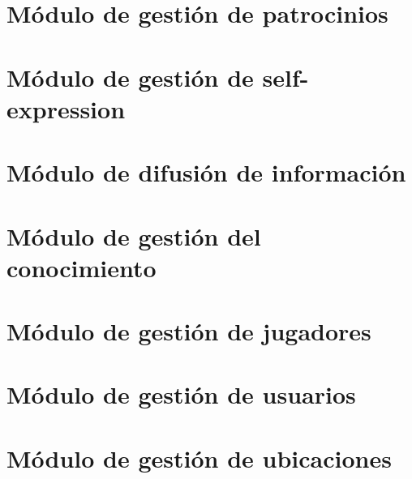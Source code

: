 \section{Módulo de gestión de patrocinios}


\clearpage

\section{Módulo de gestión de self-expression}


\section{Módulo de difusión de información}


\clearpage

\section{Módulo de gestión del conocimiento}


\section{Módulo de gestión de jugadores}


\section{Módulo de gestión de usuarios}


\section{Módulo de gestión de ubicaciones}

